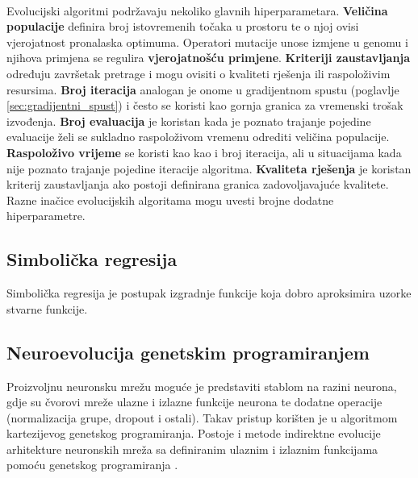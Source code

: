 \documentclass[times, utf8, numeric, diplomski]{fer}
\def\secref#1{(poglavlje \ref{#1})}
\def\TODO#1{\noindent\textcolor{red}{TODO: \textit{#1}}\newline}
\def\todo#1{\TODO{#1}}
\begin{document}
\paragraph{}
Evolucijski algoritmi podržavaju nekoliko glavnih hiperparametara. \textbf{Veličina populacije} definira broj istovremenih točaka u prostoru te o njoj ovisi vjerojatnost pronalaska optimuma. Operatori mutacije unose izmjene u genomu i njihova primjena se regulira \textbf{vjerojatnošću primjene}. \textbf{Kriteriji zaustavljanja} određuju završetak pretrage i mogu ovisiti o kvaliteti rješenja ili raspoloživim resursima. \textbf{Broj iteracija} analogan je onome u gradijentnom spustu \secref{sec:gradijentni_spust} i često se koristi kao gornja granica za vremenski trošak izvođenja. \textbf{Broj evaluacija} je koristan kada je poznato trajanje pojedine evaluacije želi se sukladno raspoloživom vremenu odrediti veličina populacije. \textbf{Raspoloživo vrijeme} se koristi kao kao i broj iteracija, ali u situacijama kada nije poznato trajanje pojedine iteracije algoritma. \textbf{Kvaliteta rješenja} je koristan kriterij zaustavljanja ako postoji definirana granica zadovoljavajuće kvalitete. Razne inačice evolucijskih algoritama mogu uvesti brojne dodatne hiperparametre.

\subsection{Simbolička regresija}
Simbolička regresija je postupak izgradnje funkcije koja dobro aproksimira uzorke stvarne funkcije.

\subsection{Neuroevolucija genetskim programiranjem}
Proizvoljnu neuronsku mrežu moguće je predstaviti stablom na razini neurona, gdje su čvorovi mreže ulazne i izlazne funkcije neurona te dodatne operacije (normalizacija grupe, dropout i ostali). Takav pristup korišten je u \citet{evo_atari} algoritmom kartezijevog genetskog programiranja. Postoje i metode indirektne evolucije arhitekture neuronskih mreža sa definiranim ulaznim i izlaznim funkcijama pomoću genetskog programiranja \citep{kitano, gruau}.

%
\end{document}
